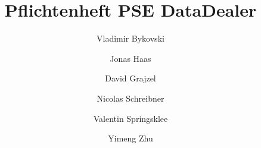 \documentclass[a4paper]{scrreprt}
\begin{document}
\title{Pflichtenheft PSE DataDealer}
\author{Vladimir Bykovski 
			\and Jonas Haas 
			\and David Grajzel 
			\and Nicolas Schreibner
			\and Valentin Springsklee
			\and Yimeng Zhu}

\maketitle

\newpage

\setcounter{page}{1} %

\tableofcontents




\end{document}
